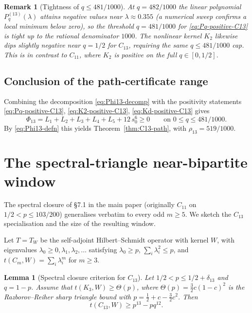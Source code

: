 \documentclass[11pt]{article}
\newtheorem{lemma}[theorem]{Lemma}
\newtheorem{remark}[theorem]{Remark}
\begin{document}
\begin{remark}[Tightness of $q \le 481/1000$]\label{rmk:tight}
At $q = 482/1000$ the linear polynomial $P_q^{(13)}(\lambda)$ attains negative values near $\lambda \approx 0.355$ (a numerical sweep confirms a local minimum below zero), so the threshold $q = 481/1000$ for \eqref{eq:Pq-positive-C13} is tight up to the rational denominator $1000$.  The nonlinear kernel $K_2$ likewise dips slightly negative near $q = 1/2$ for $C_{13}$, requiring the same $q \le 481/1000$ cap.  This is in contrast to $C_{11}$, where $K_2$ is positive on the full $q \in [0, 1/2]$.
\end{remark}

\subsection{Conclusion of the path-certificate range}

Combining the decomposition \eqref{eq:Phi13-decomp} with the positivity statements \eqref{eq:Pq-positive-C13}, \eqref{eq:K2-positive-C13}, \eqref{eq:Kd-positive-C13} gives
\[
        \Phi_{13} = L_1 + L_2 + L_3 + L_4 + L_5 + 12\, s_0^6 \ge 0
        \qquad \text{on } 0 \le q \le 481/1000.
\]
By \eqref{eq:Phi13-defn} this yields Theorem~\ref{thm:C13-path}, with $\rho_{13} = 519/1000$.

\section{The spectral-triangle near-bipartite window}\label{sec:spectral}

The spectral closure of \S 7.1 in the main paper (originally $C_{11}$ on $1/2 < p \le 103/200$) generalises verbatim to every odd $m \ge 5$.  We sketch the $C_{13}$ specialisation and the size of the resulting window.

Let $T = T_W$ be the self-adjoint Hilbert--Schmidt operator with kernel $W$, with eigenvalues $\lambda_0 \ge 0, \lambda_1, \lambda_2, \ldots$ satisfying $\lambda_0 \ge p$, $\sum_i \lambda_i^2 \le p$, and $t(C_m, W) = \sum_i \lambda_i^m$ for $m \ge 3$.

\begin{lemma}[Spectral closure criterion for $C_{13}$]\label{lem:spectral-C13}
Let $1/2 < p \le 1/2 + \delta_{13}$ and $q = 1 - p$.  Assume that $t(K_3, W) \ge \Theta(p)$, where $\Theta(p) = \tfrac32 c(1-c)^2$ is the Razborov--Reiher sharp triangle bound with $p = \tfrac12 + c - \tfrac32 c^2$.  Then
\[
        t(C_{13}, W) \ge p^{13} - pq^{12}.
\]
\end{lemma}
\end{document}
